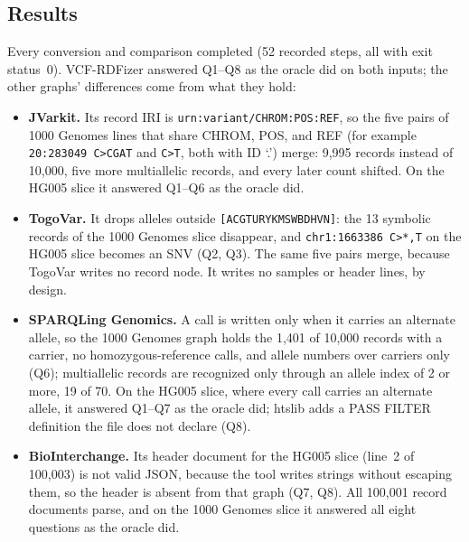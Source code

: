 \documentclass[11pt]{article}
\begin{document}
\subsection{Results}\label{subsec:converters-results}
Every conversion and comparison completed (52 recorded steps, all with exit status~0).
VCF-RDFizer answered Q1--Q8 as the oracle did on both inputs; the other graphs' differences come from what they hold:
\begin{itemize}
\item \textbf{JVarkit.} Its record IRI is \texttt{urn:variant/CHROM:POS:REF}, so the five pairs of 1000 Genomes lines that share CHROM, POS, and REF (for example \texttt{20:283049 C>CGAT} and \texttt{C>T}, both with ID `.') merge: 9,995 records instead of 10,000, five more multiallelic records, and every later count shifted. On the HG005 slice it answered Q1--Q6 as the oracle did.
\item \textbf{TogoVar.} It drops alleles outside \texttt{[ACGTURYKMSWBDHVN]}: the 13 symbolic records of the 1000 Genomes slice disappear, and \texttt{chr1:1663386 C>*,T} on the HG005 slice becomes an SNV (Q2, Q3). The same five pairs merge, because TogoVar writes no record node. It writes no samples or header lines, by design.
\item \textbf{SPARQLing Genomics.} A call is written only when it carries an alternate allele, so the 1000 Genomes graph holds the 1,401 of 10,000 records with a carrier, no homozygous-reference calls, and allele numbers over carriers only (Q6); multiallelic records are recognized only through an allele index of 2 or more, 19 of 70. On the HG005 slice, where every call carries an alternate allele, it answered Q1--Q7 as the oracle did; htslib adds a PASS FILTER definition the file does not declare (Q8).
\item \textbf{BioInterchange.} Its header document for the HG005 slice (line~2 of 100,003) is not valid JSON, because the tool writes strings without escaping them, so the header is absent from that graph (Q7, Q8). All 100,001 record documents parse, and on the 1000 Genomes slice it answered all eight questions as the oracle did.
\end{itemize}
\end{document}
